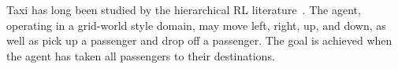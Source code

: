 %
%


Taxi has long been studied by the hierarchical RL literature~\cite{dietterich2000hierarchical}. The agent, operating in a grid-world style domain, may move left, right, up, and down, as well as pick up a passenger and drop off a passenger. The goal is achieved when the agent has taken all passengers to their destinations.






